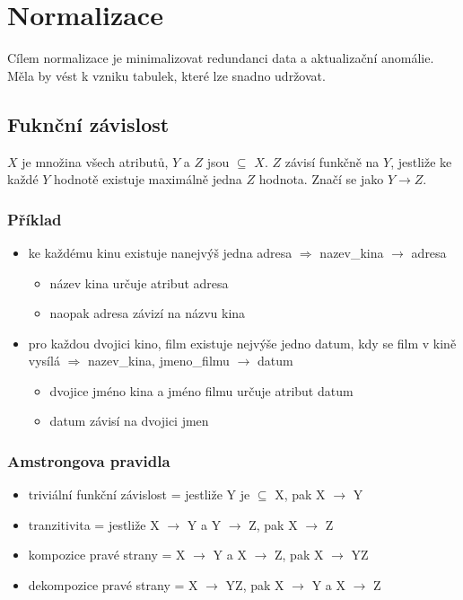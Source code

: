 \documentclass{szzclass}
\begin{document}
\tableofcontents
\newpage

\section{Normalizace}
Cílem normalizace je minimalizovat redundanci data a aktualizační anomálie. Měla by vést k vzniku tabulek,
které lze snadno udržovat.

\subsection{Fuknční závislost}
$X$ je množina všech atributů, $Y$ a $Z$ jsou $\subseteq$ $X$. $Z$ závisí funkčně na $Y$, jestliže ke každé $Y$ hodnotě
existuje maximálně jedna $Z$ hodnota. Značí se jako $Y \rightarrow Z$.

\subsubsection{Příklad}
\begin{itemize}
  \item ke každému kinu existuje nanejvýš jedna adresa $\Rightarrow$ nazev\_kina $\rightarrow$ adresa
  \begin{itemize}
    \item název kina určuje atribut adresa
    \item naopak adresa závizí na názvu kina
  \end{itemize}
  \item pro každou dvojici {kino, film} existuje nejvýše jedno datum, kdy se film v kině vysílá $\Rightarrow$ nazev\_kina, jmeno\_filmu $\rightarrow$ datum
  \begin{itemize}
    \item dvojice jméno kina a jméno filmu určuje atribut datum
    \item datum závisí na dvojici jmen
  \end{itemize}
\end{itemize}
\subsubsection{Amstrongova pravidla}
\begin{itemize}
  \item triviální funkční závislost = jestliže Y je $\subseteq$ X, pak X $\rightarrow$ Y
  \item tranzitivita = jestliže X $\rightarrow$ Y a Y $\rightarrow$ Z, pak X $\rightarrow$ Z
  \item kompozice pravé strany = X $\rightarrow$ Y a X $\rightarrow$ Z, pak X $\rightarrow$ YZ
  \item dekompozice pravé strany = X $\rightarrow$ YZ, pak X $\rightarrow$ Y a X $\rightarrow$ Z
\end{itemize}
\end{document}
